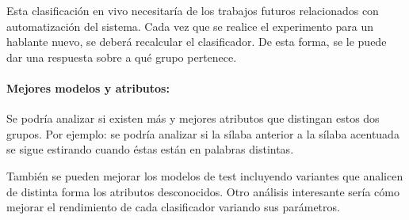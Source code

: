 Esta clasificación en vivo necesitaría de los trabajos futuros relacionados con automatización del sistema. Cada vez que se realice el experimento para un hablante nuevo, se deberá recalcular el clasificador. De esta forma, se le puede dar una respuesta sobre a qué grupo pertenece.

\paragraph*{Mejores modelos y atributos:} Se podría analizar si existen más y mejores atributos que distingan estos dos grupos. Por ejemplo: se podría analizar si la sílaba anterior a la sílaba acentuada se sigue estirando cuando éstas están en palabras distintas.

También se pueden mejorar los modelos de test incluyendo variantes que analicen de distinta forma los atributos desconocidos. Otro análisis interesante sería cómo mejorar el rendimiento de cada clasificador variando sus parámetros.